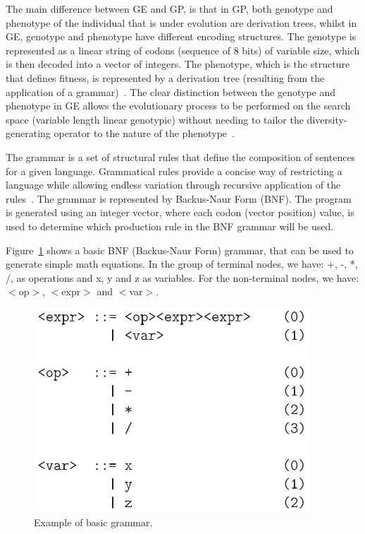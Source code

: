 \documentclass[conference,compsoc]{IEEEtran}
\begin{document}
The main difference between GE and GP, is that in GP, both genotype and phenotype of the individual that is under evolution are derivation trees, whilst in GE, genotype and phenotype have different encoding structures. The genotype is represented as a linear string of codons (sequence of 8 bits) of variable size, which is then decoded into a vector of integers. The phenotype, which is the structure that defines fitness, is represented by a derivation tree (resulting from the application of a grammar)~\cite{cerri2013grammatical}. The clear distinction between the genotype and phenotype in GE allows the evolutionary process to be performed on the search space (variable length linear genotypic) without needing to tailor the diversity-generating operator to the nature of the phenotype~\cite{sabar2013grammatical}.

The grammar is a set of structural rules that define the composition of sentences for a given language. Grammatical rules provide a concise way of restricting a language while allowing endless variation through recursive application of the rules~\cite{byrne2015optimising}. The grammar is represented by Backus-Naur Form (BNF). The program is generated using an integer vector, where each codon (vector position) value, is used to determine which production rule in the BNF grammar will be used.

Figure~\ref{fig:grammar} shows a basic BNF (Backus-Naur Form) grammar, that can be used to generate simple math equations. In the group of terminal nodes, we have: +, -, *, /, as operations and x, y and z as variables. For the non-terminal nodes, we have: $<$op$>$, $<$expr$>$ and $<$var$>$.

\begin{figure}[!htb]
	\centering
	\includegraphics[scale=.6]{figures/grammar.png}
	\caption{Example of basic grammar.~\cite{ryan1998grammatical}}
	\label{fig:grammar}
\end{figure}
\end{document}
